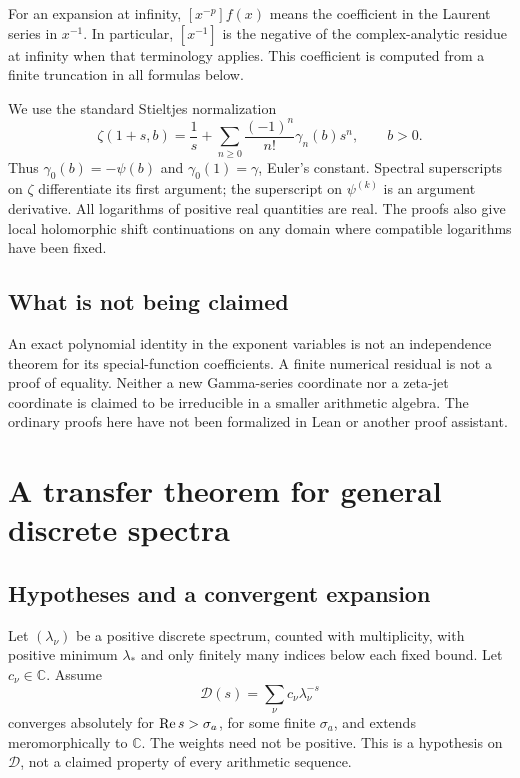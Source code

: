 \documentclass[11pt]{article}
\numberwithin{equation}{section}
\theoremstyle{definition}\newtheorem{definition}[theorem]{Definition}
\theoremstyle{remark}\newtheorem{remark}[theorem]{Remark}\newtheorem{example}[theorem]{Example}
\newcommand{\C}{\mathbb C}\newcommand{\N}{\mathbb N}\newcommand{\Z}{\mathbb Z}
\newcommand{\D}{\mathscr D}\newcommand{\calH}{\mathcal H}\newcommand{\calR}{\mathcal R}
\begin{document}
For an expansion at infinity, $[x^{-p}]f(x)$ means the coefficient in the
Laurent series in $x^{-1}$. In particular, $[x^{-1}]$ is the negative of the
complex-analytic residue at infinity when that terminology applies. This
coefficient is computed from a finite truncation in all formulas below.

We use the standard Stieltjes normalization
\begin{equation}\label{asj:eq:stieltjes}
 \zeta(1+s,b)=\frac1s+\sum_{n\ge0}\frac{(-1)^n}{n!}\gamma_n(b)s^n,
 \qquad b>0.
\end{equation}
Thus $\gamma_0(b)=-\psi(b)$ and $\gamma_0(1)=\gamma$, Euler's constant.
Spectral superscripts on $\zeta$ differentiate its first argument; the
superscript on $\psi^{(k)}$ is an argument derivative. All logarithms of positive
real quantities are real. The proofs also give local holomorphic shift
continuations on any domain where compatible logarithms have been fixed.

\subsection{What is not being claimed}
An exact polynomial identity in the exponent variables is not an independence
theorem for its special-function coefficients. A finite numerical residual is
not a proof of equality. Neither a new Gamma-series coordinate nor a zeta-jet
coordinate is claimed to be irreducible in a smaller arithmetic algebra.
The ordinary proofs here have not been formalized in Lean or another proof
assistant.



\section{A transfer theorem for general discrete spectra}
\label{asj:sec:transfer}

\subsection{Hypotheses and a convergent expansion}
Let $(\lambda_\nu)$ be a positive discrete spectrum, counted with multiplicity,
with positive minimum $\lambda_*$ and only finitely many indices below each
fixed bound. Let $c_\nu\in\C$. Assume
\begin{equation}\label{asj:eq:base}
 \D(s)=\sum_\nu c_\nu\lambda_\nu^{-s}
\end{equation}
converges absolutely for $\operatorname{Re} s>\sigma_a$, for some finite $\sigma_a$, and
extends meromorphically to $\C$. The weights need not be positive. This is a
hypothesis on $\D$, not a claimed property of every arithmetic sequence.
\end{document}
